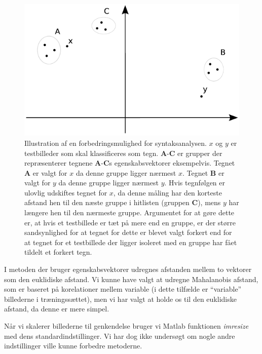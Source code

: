 
\begin{figure}[htp]
\centering
\includegraphics{implementation/illu/syntaks_forbedring.pdf}
\caption{Illustration af en forbedringsmulighed for syntaksanalysen. $x$ og $y$ er testbilleder som skal klassificeres som tegn. \textbf{A}-\textbf{C} er grupper der repræsenterer tegnene \textbf{A}-\textbf{C}s egenskabsvektorer eksempelvis. Tegnet \textbf{A} er valgt for $x$ da denne gruppe ligger nærmest $x$. Tegnet \textbf{B} er valgt for $y$ da denne gruppe ligger nærmest $y$. Hvis tegnfølgen er ulovlig udskiftes tegnet for $x$, da denne måling har den korteste afstand hen til den næste gruppe i hitlisten (gruppen \textbf{C}), mens $y$ har længere hen til den nærmeste gruppe. Argumentet for at gøre dette er, at hvis et testbillede er tæt på mere end en gruppe, er der større sandsynlighed for at tegnet for dette er blevet valgt forkert end for at tegnet for et testbillede der ligger isoleret med en gruppe har fået tildelt et forkert tegn.}
\label{fig:syntaks_forbedring}
\end{figure}

I metoden der bruger egenskabsvektorer udregnes afstanden mellem to vektorer som den euklidiske afstand. Vi kunne have valgt at udregne Mahalanobis afstand, som er baseret på korelationer mellem variable (i dette tilfælde er ``variable'' billederne i træningssættet), men vi har valgt at holde os til den euklidiske afstand, da denne er mere simpel.

Når vi skalerer billederne til genkendelse bruger vi Matlab funktionen \textit{imresize} med dens standardindstillinger. Vi har dog ikke undersøgt om nogle andre indstillinger ville kunne forbedre metoderne.